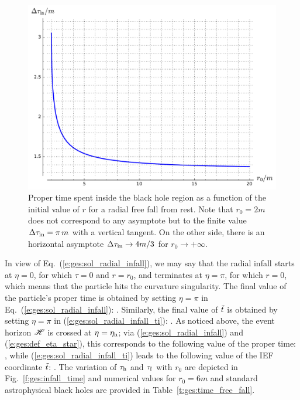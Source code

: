 \begin{figure}
\centerline{\includegraphics[height=0.4\textheight]{ges_time_inside.pdf}}
\caption[]{\label{f:ges:time_inside} \footnotesize
Proper time spent inside the black hole region as a function
of the initial value of $r$ for a radial free fall from rest.
Note that $r_0=2m$ does not correspond to any asymptote but to the
finite value $\Delta\tau_{\rm in} = \pi\, m$ with a vertical tangent.
On the other side, there is an horizontal asymptote
$\Delta\tau_{\rm in} \rightarrow 4m/3$ for $r_0\rightarrow +\infty$.}
\end{figure}

In view of Eq.~(\ref{e:ges:sol_radial_infall}), we may say that the radial
infall starts at $\eta=0$, for which $\tau=0$ and $r=r_0$, and terminates
at $\eta=\pi$, for which $r=0$, which means that the particle hits the curvature
singularity. The final value of the particle's proper time is obtained by
setting $\eta=\pi$ in Eq.~(\ref{e:ges:sol_radial_infall}):
\be
     .
\ee
Similarly, the final value of ${\tilde t}$ is obtained by setting $\eta=\pi$ in (\ref{e:ges:sol_radial_infall_ti}):
\be
     .
\ee
As noticed above, the event horizon $\mathscr{H}$ is crossed at $\eta=\eta_{\rm h}$;
via (\ref{e:ges:sol_radial_infall}) and (\ref{e:ges:def_eta_star}), this corresponds to the following value
of the proper time:
\be
     ,
\ee
while (\ref{e:ges:sol_radial_infall_ti}) leads to the following value
of the IEF coordinate ${\tilde t}$:
\be
     .
\ee
The variation of $\tau_{\rm h}$ and $\tau_{\rm f}$ with $r_0$ are depicted in
Fig.~\ref{f:ges:infall_time} and numerical values for $r_0=6m$ and
standard astrophysical black holes are provided in
Table~\ref{t:ges:time_free_fall}.

